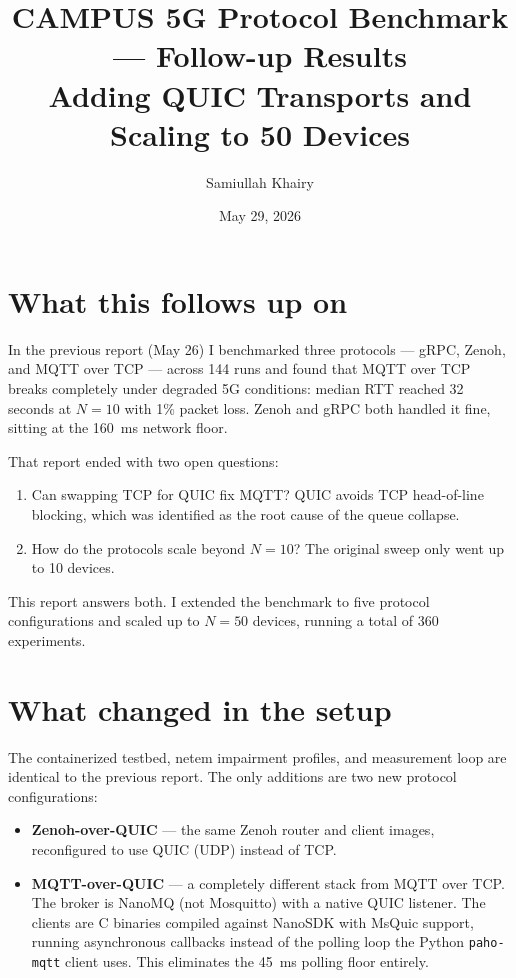 \documentclass[11pt,a4paper]{article}
\title{CAMPUS 5G Protocol Benchmark --- Follow-up Results\\[0.3em]
\large Adding QUIC Transports and Scaling to 50 Devices}
\author{Samiullah Khairy}
\date{May 29, 2026}
\begin{document}
\maketitle

\section{What this follows up on}

In the previous report (May 26) I benchmarked three protocols --- gRPC, Zenoh, and MQTT over TCP --- across 144 runs and found that MQTT over TCP breaks completely under degraded 5G conditions: median RTT reached 32 seconds at $N=10$ with 1\% packet loss. Zenoh and gRPC both handled it fine, sitting at the 160~ms network floor.

That report ended with two open questions:
\begin{enumerate}
    \item Can swapping TCP for QUIC fix MQTT? QUIC avoids TCP head-of-line blocking, which was identified as the root cause of the queue collapse.
    \item How do the protocols scale beyond $N=10$? The original sweep only went up to 10 devices.
\end{enumerate}

This report answers both. I extended the benchmark to five protocol configurations and scaled up to $N=50$ devices, running a total of 360 experiments.

\section{What changed in the setup}

The containerized testbed, netem impairment profiles, and measurement loop are identical to the previous report. The only additions are two new protocol configurations:

\begin{itemize}
    \item \textbf{Zenoh-over-QUIC} --- the same Zenoh router and client images, reconfigured to use QUIC (UDP) instead of TCP.
    \item \textbf{MQTT-over-QUIC} --- a completely different stack from MQTT over TCP. The broker is NanoMQ (not Mosquitto) with a native QUIC listener. The clients are C binaries compiled against NanoSDK with MsQuic support, running asynchronous callbacks instead of the polling loop the Python \texttt{paho-mqtt} client uses. This eliminates the 45~ms polling floor entirely.
\end{itemize}
\end{document}
